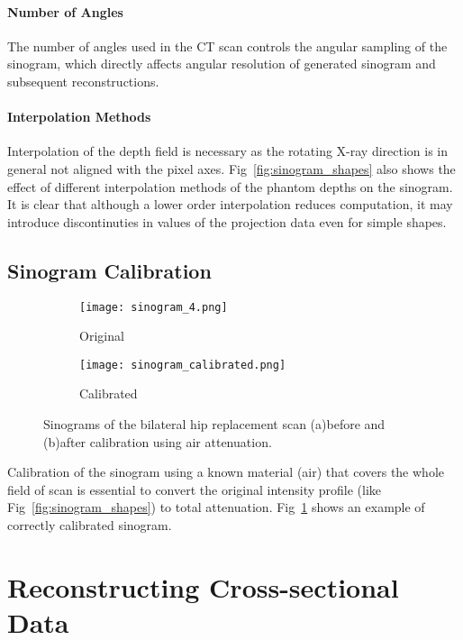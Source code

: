 \documentclass[10pt,twocolumn]{article}
\begin{document}
\paragraph{Number of Angles}
The number of angles used in the CT scan controls the angular sampling of the sinogram, which directly affects angular resolution of generated sinogram and subsequent reconstructions. 

\paragraph{Interpolation Methods}
Interpolation of the depth field is necessary as the rotating X-ray direction is in general not aligned with the pixel axes. Fig~\ref{fig:sinogram_shapes} also shows the effect of different interpolation methods of the phantom depths on the sinogram. It is clear that although a lower order interpolation reduces computation, it may introduce discontinuties in values of the projection data even for simple shapes.

\subsection{Sinogram Calibration}
\begin{figure}[htbp]
    \centering
    \begin{subfigure}[b]{0.44\linewidth}
        \texttt{[image: sinogram\_4.png]}
        \caption{Original}
    \end{subfigure}
    \hspace{0.03\linewidth}
    \begin{subfigure}[b]{0.44\linewidth}
        \texttt{[image: sinogram\_calibrated.png]}
        \caption{Calibrated}
    \end{subfigure}
    \caption{Sinograms of the bilateral hip replacement scan (a)before and (b)after calibration using air attenuation.}
    \label{fig:sinogram_calibration}
\end{figure}
Calibration of the sinogram using a known material (air) that covers the whole field of scan is essential to convert the original intensity profile (like Fig~\ref{fig:sinogram_shapes}) to total attenuation. 
Fig~\ref{fig:sinogram_calibration} shows an example of correctly calibrated sinogram.

\section{Reconstructing Cross-sectional Data}
\end{document}
